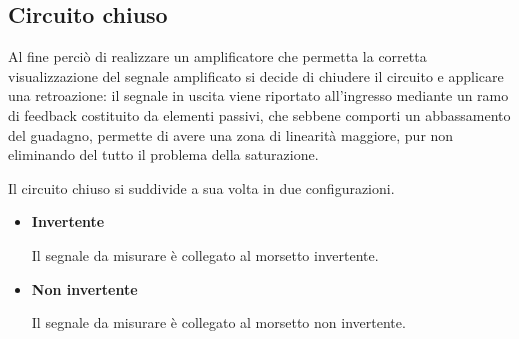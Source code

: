 \documentclass[a4paper, 15pt]{article}
\begin{document}
\subsection{Circuito chiuso}
\begin{adjustwidth}{2in}{}	   		
		Al fine perciò di realizzare un amplificatore che permetta la corretta visualizzazione del segnale amplificato si decide di chiudere il circuito e applicare una retroazione: il segnale in uscita viene riportato all'ingresso mediante un ramo di feedback costituito da elementi passivi, che sebbene comporti un abbassamento del guadagno, permette di avere una zona di linearità maggiore, pur non eliminando del tutto il problema della saturazione.\newline
		
   		Il circuito chiuso si suddivide a sua volta in due configurazioni.  
\begin{itemize}	   		
   		\item \textbf{Invertente}
   		 
   		Il segnale da misurare è collegato al morsetto invertente.   		
   		\begin{figure}[H]
   			\centering
   		\end{figure}
   		
   		\item \textbf{Non invertente} 
   		
   		Il segnale da misurare è collegato al morsetto non invertente.    		
   		   		\begin{figure}[H]
   			\centering
   		\end{figure}   		
\end{itemize}
\end{adjustwidth}
\newpage
\end{document}
